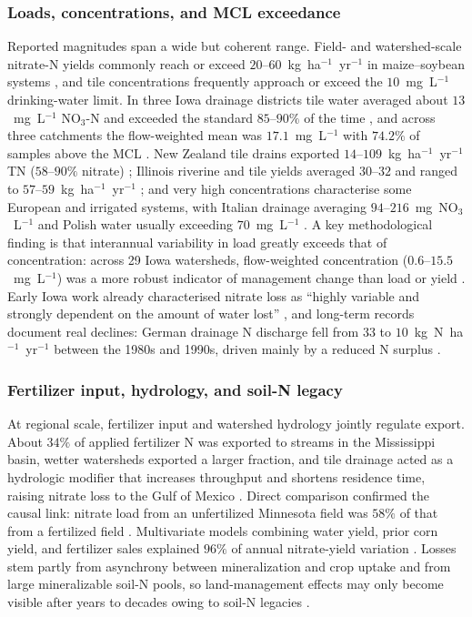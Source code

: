 \documentclass[11pt]{article}
\begin{document}
\subsubsection{Loads, concentrations, and MCL exceedance}

Reported magnitudes span a wide but coherent range. Field- and watershed-scale
nitrate-N yields commonly reach or exceed $20$--$60$~kg~ha$^{-1}$~yr$^{-1}$ in
maize--soybean systems
\parencite{Gentry2009,Gentry2014,Dattamudi2020,Tomer2008}, and tile
concentrations frequently approach or exceed the $10$~mg~L$^{-1}$
drinking-water limit. In three Iowa drainage districts tile water averaged
about $13$~mg~L$^{-1}$ NO$_3$-N and exceeded the standard $85$--$90\%$ of the
time \parencite{Schilling2012b}, and across three catchments the flow-weighted
mean was $17.1$~mg~L$^{-1}$ with $74.2\%$ of samples above the MCL
\parencite{Ikenberry2014}. New Zealand tile drains exported
$14$--$109$~kg~ha$^{-1}$~yr$^{-1}$ TN ($58$--$90\%$ nitrate)
\parencite{Tanner2011}; Illinois riverine and tile yields averaged $30$--$32$
and ranged to $57$--$59$~kg~ha$^{-1}$~yr$^{-1}$ \parencite{Gentry2014}; and very
high concentrations characterise some European and irrigated systems, with
Italian drainage averaging $94$--$216$~mg~NO$_3$~L$^{-1}$ \parencite{ROSSI1991}
and Polish water usually exceeding $70$~mg~L$^{-1}$ \parencite{Dragon2016}. A
key methodological finding is that interannual variability in load greatly
exceeds that of concentration: across 29 Iowa watersheds, flow-weighted
concentration ($0.6$--$15.5$~mg~L$^{-1}$) was a more robust indicator of
management change than load or yield \parencite{Danalatos2022}. Early Iowa work
already characterised nitrate loss as ``highly variable and strongly dependent
on the amount of water lost'' \parencite{BAKER1975}, and long-term records
document real declines: German drainage N discharge fell from $33$ to
$10$~kg~N~ha$^{-1}$~yr$^{-1}$ between the 1980s and 1990s, driven mainly by a
reduced N surplus \parencite{Hirt2005b}.

\subsubsection{Fertilizer input, hydrology, and soil-N legacy}

At regional scale, fertilizer input and watershed hydrology jointly regulate
export. About $34\%$ of applied fertilizer N was exported to streams in the
Mississippi basin, wetter watersheds exported a larger fraction, and tile
drainage acted as a hydrologic modifier that increases throughput and shortens
residence time, raising nitrate loss to the Gulf of Mexico
\parencite{Raymond2012}. Direct comparison confirmed the causal link: nitrate
load from an unfertilized Minnesota field was $58\%$ of that from a fertilized
field \parencite{Ghane2016b}. Multivariate models combining water yield, prior
corn yield, and fertilizer sales explained $96\%$ of annual nitrate-yield
variation \parencite{Gentry2014}. Losses stem partly from asynchrony between
mineralization and crop uptake and from large mineralizable soil-N pools, so
land-management effects may only become visible after years to decades owing to
soil-N legacies \parencite{Cambardella1999,Bauwe2020}.
\end{document}
